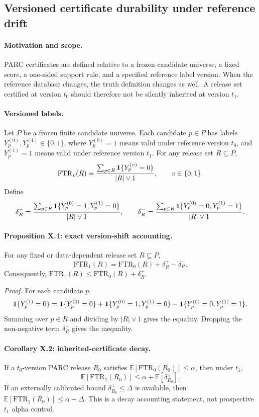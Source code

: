 \subsection{Versioned certificate durability under reference drift}
\paragraph{Motivation and scope.}
PARC certificates are defined relative to a frozen candidate universe, a fixed
score, a one-sided support rule, and a specified reference label version.  When
the reference database changes, the truth definition changes as well.  A release
set certified at version \(t_0\) should therefore not be silently inherited at
version \(t_1\).

\paragraph{Versioned labels.}
Let \(P\) be a frozen finite candidate universe.  Each candidate \(p\in P\)
has labels \(Y_p^{(0)},Y_p^{(1)}\in\{0,1\}\), where \(Y_p^{(0)}=1\) means valid
under reference version \(t_0\), and \(Y_p^{(1)}=1\) means valid under reference
version \(t_1\).  For any release set \(R\subseteq P\),
\[
\mathrm{FTR}_v(R)=
\frac{\sum_{p\in R}{\bf 1}\{Y_p^{(v)}=0\}}{|R|\vee 1},\qquad v\in\{0,1\}.
\]
Define
\[
\delta_R^+ =
\frac{\sum_{p\in R}{\bf 1}\{Y_p^{(0)}=1,Y_p^{(1)}=0\}}{|R|\vee 1},
\qquad
\delta_R^- =
\frac{\sum_{p\in R}{\bf 1}\{Y_p^{(0)}=0,Y_p^{(1)}=1\}}{|R|\vee 1}.
\]

\paragraph{Proposition X.1: exact version-shift accounting.}
For any fixed or data-dependent release set \(R\subseteq P\),
\[
\mathrm{FTR}_1(R)=\mathrm{FTR}_0(R)+\delta_R^+-\delta_R^-.
\]
Consequently, \(\mathrm{FTR}_1(R)\le \mathrm{FTR}_0(R)+\delta_R^+\).

\emph{Proof.}
For each candidate \(p\),
\[
{\bf 1}\{Y_p^{(1)}=0\} =
{\bf 1}\{Y_p^{(0)}=0\}
+{\bf 1}\{Y_p^{(0)}=1,Y_p^{(1)}=0\}
-{\bf 1}\{Y_p^{(0)}=0,Y_p^{(1)}=1\}.
\]
Summing over \(p\in R\) and dividing by \(|R|\vee 1\) gives the equality.
Dropping the non-negative term \(\delta_R^-\) gives the inequality.

\paragraph{Corollary X.2: inherited-certificate decay.}
If a \(t_0\)-version PARC release \(R_0\) satisfies
\(\mathbb E[\mathrm{FTR}_0(R_0)]\le \alpha\), then under \(t_1\),
\[
\mathbb E[\mathrm{FTR}_1(R_0)]\le \alpha+\mathbb E[\delta_{R_0}^+].
\]
If an externally calibrated bound \(\delta_{R_0}^+\le \Delta\) is available,
then \(\mathbb E[\mathrm{FTR}_1(R_0)]\le \alpha+\Delta\).  This is a decay
accounting statement, not prospective \(t_1\) alpha control.

